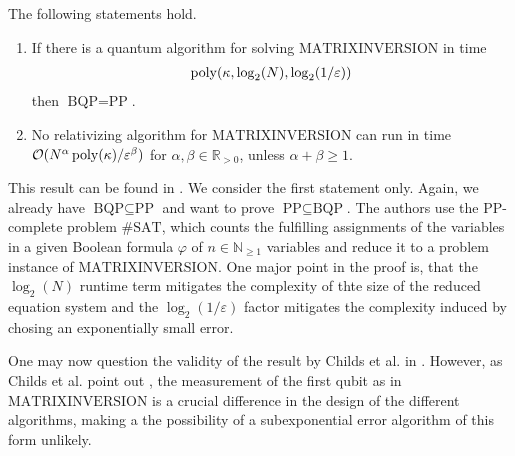 \begin{theorem}
    The following statements hold.
    \begin{enumerate}[label=(\roman*)]
        \item If there is a quantum algorithm for solving \(\text{MATRIXINVERSION}\) in time
        \begin{align}
            \operatorname{poly}(\kappa, \log_2(N), \log_2(1/\varepsilon))
        \end{align}
        then \(\text{BQP} = \text{PP}\).
        \item No relativizing algorithm for \(\text{MATRIXINVERSION}\) can run in time \(\operatorname{\mathcal{O}}(N^\alpha\operatorname{poly}(\kappa)/\varepsilon^\beta)\) for \(\alpha, \beta \in \mathbb{R}_{> 0}\), unless \(\alpha + \beta \geq 1\).
    \end{enumerate}
\end{theorem}

This result can be found in \cite[p. 14]{Harrow2008}. We consider the first statement only. Again, we already have \(\text{BQP} \subseteq \text{PP}\) and want to prove \(\text{PP} \subseteq \text{BQP}\). The authors use the \(\text{PP}\)-complete problem \(\text{\#SAT}\), which counts the fulfilling assignments of the variables in a given Boolean formula \(\varphi\) of \(n \in \mathbb{N}_{\geq 1}\) variables and reduce it to a problem instance of \(\text{MATRIXINVERSION}\). One major point in the proof is, that the \(\log_2(N)\) runtime term mitigates the complexity of thte size of the reduced equation system and the \(\log_2(1/\varepsilon)\) factor mitigates the complexity induced by chosing an exponentially small error.

\begin{remark}
    One may now question the validity of the result by Childs et al. in . However, as Childs et al. point out \cite[p. 2]{Childs2015}, the measurement of the first qubit as in \(\text{MATRIXINVERSION}\) is a crucial difference in the design of the different algorithms, making a the possibility of a subexponential error algorithm of this form unlikely.
\end{remark}
